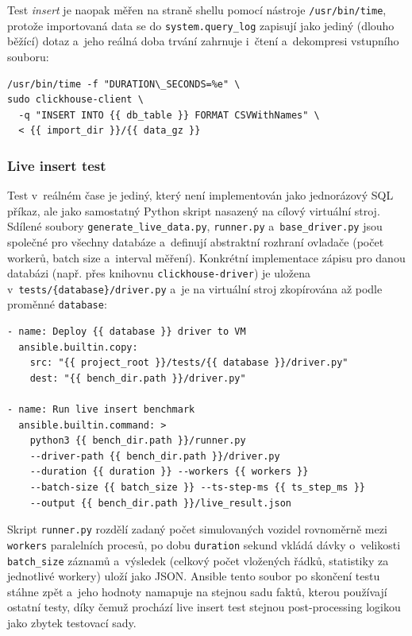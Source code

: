 Test \textit{insert} je naopak měřen na straně shellu pomocí nástroje \texttt{/usr/bin/time}, protože importovaná data se do \texttt{system.query\_log} zapisují jako jediný (dlouho běžící) dotaz a~jeho reálná doba trvání zahrnuje i~čtení a~dekompresi vstupního souboru:

\begin{lstlisting}[caption={Výřez z~tests/clickhousedb/insert.yml}, label={lst:chinsert}, captionpos=b]
/usr/bin/time -f "DURATION\_SECONDS=%e" \
sudo clickhouse-client \
  -q "INSERT INTO {{ db_table }} FORMAT CSVWithNames" \
  < {{ import_dir }}/{{ data_gz }}
\end{lstlisting}

\subsubsection{Live insert test}
Test v~reálném čase je jediný, který není implementován jako jednorázový SQL příkaz, ale jako samostatný Python skript nasazený na cílový virtuální stroj. 
Sdílené soubory \texttt{generate\_live\_data.py}, \texttt{runner.py} a~\texttt{base\_driver.py} jsou společné pro všechny databáze a~definují abstraktní rozhraní ovladače (počet workerů, batch size a~interval měření). 
Konkrétní implementace zápisu pro danou databázi (např. přes knihovnu \texttt{clickhouse-driver}) je uložena v~\texttt{tests/\{database\}/driver.py} a~je na virtuální stroj zkopírována až podle proměnné \texttt{database}:

\begin{lstlisting}[caption={Výřez z~tests/clickhousedb/live\_insert.yml}, label={lst:liveinserttask}, captionpos=b]
- name: Deploy {{ database }} driver to VM
  ansible.builtin.copy:
    src: "{{ project_root }}/tests/{{ database }}/driver.py"
    dest: "{{ bench_dir.path }}/driver.py"

- name: Run live insert benchmark
  ansible.builtin.command: >
    python3 {{ bench_dir.path }}/runner.py
    --driver-path {{ bench_dir.path }}/driver.py
    --duration {{ duration }} --workers {{ workers }}
    --batch-size {{ batch_size }} --ts-step-ms {{ ts_step_ms }}
    --output {{ bench_dir.path }}/live_result.json
\end{lstlisting}

Skript \texttt{runner.py} rozdělí zadaný počet simulovaných vozidel rovnoměrně mezi \texttt{workers} paralelních procesů, po dobu \texttt{duration} sekund vkládá dávky o~velikosti \texttt{batch\_size} záznamů a~výsledek (celkový počet vložených řádků, statistiky za jednotlivé workery) uloží jako JSON. 
Ansible tento soubor po skončení testu stáhne zpět a~jeho hodnoty namapuje na stejnou sadu faktů, kterou používají ostatní testy, díky čemuž prochází live insert test stejnou post-processing logikou jako zbytek testovací sady.

